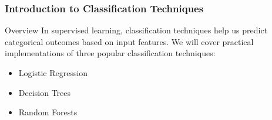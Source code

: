 \documentclass[aspectratio=169]{beamer}
\begin{document}
\begin{frame}
    \titlepage
\end{frame}

\begin{frame}
    \frametitle{Introduction to Classification Techniques}
    \begin{block}{Overview}
        In supervised learning, classification techniques help us predict categorical outcomes based on input features. We will cover practical implementations of three popular classification techniques:
    \end{block}
    \begin{itemize}
        \item Logistic Regression
        \item Decision Trees
        \item Random Forests
    \end{itemize}
\end{frame}
\end{document}
